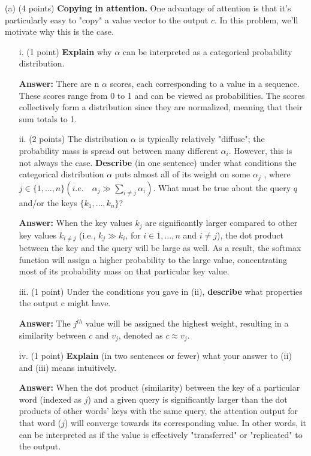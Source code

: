 \documentclass[letterpaper,12pt]{article}
\begin{document}
	\noindent(a) (4 points) \textbf{Copying in attention.} One advantage of attention is that it's particularly easy to "copy" a value vector to the output $c$. In this problem, we'll motivate why this is the case.
		
	\begin{itemize}
	\item [i.]
	(1 point) \textbf{Explain} why $\alpha$ can be interpreted as a categorical probability distribution.
			
	\textcolor{blue!70}{\textbf{Answer:} There are n $\alpha$ scores, each corresponding to a value in a sequence. These scores range from 0 to 1 and can be viewed as probabilities. The scores collectively form a distribution since they are normalized, meaning that their sum totals to 1.}

	\item [ii.]
	(2 points) The distribution $\alpha$ is typically relatively "diffuse"; the probability mass is spread out between many different $\alpha_i$. However, this is not always the case. \textbf{Describe} (in one sentence) under what conditions the categorical distribution $\alpha$ puts almost all of its weight on some $\alpha_j$ , where $j \in \{1, \ldots , n\} (i.e. \quad \alpha_j \gg \sum_{i\neq j} \alpha_i)$. What must be true about the query $q$ and/or the keys $\{k_1, \ldots , k_n\}$?
			
	\textcolor{blue!70}{\textbf{Answer:} When the key values $k_j$ are significantly larger compared to other key values $k_{i\neq j}$ (i.e., $k_j \gg k_i$, for $i \in {1,\ldots, n}$ and $i \neq j$), the dot product between the key and the query will be large as well. As a result, the softmax function will assign a higher probability to the large value, concentrating most of its probability mass on that particular key value.}

	\item [iii.]
	(1 point) Under the conditions you gave in (ii), \textbf{describe} what properties the output c might have.
			
	\textcolor{blue!70}{\textbf{Answer:} The $j^{th}$ value will be assigned the highest weight, resulting in a similarity between $c$ and $v_j$, denoted as $c \approx v_j$.}

    \item [iv.]
	(1 point) \textbf{Explain} (in two sentences or fewer) what your answer to (ii) and (iii) means intuitively.
			
	\textcolor{blue!70}{\textbf{Answer:} When the dot product (similarity) between the key of a particular word (indexed as $j$) and a given query is significantly larger than the dot products of other words' keys with the same query, the attention output for that word ($j$) will converge towards its corresponding value. In other words, it can be interpreted as if the value is effectively "transferred" or "replicated" to the output.}
	\end{itemize}	
		
\end{document}
